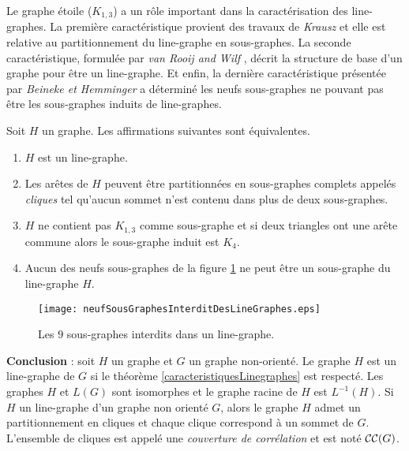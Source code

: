 Le graphe \'etoile ($K_{1,3}$) a un r\^ole important dans la caract\'erisation des line-graphes.
La premi\`ere caract\'eristique provient des travaux de {\em Krausz} \cite{krausz1943demonstration} et elle est relative au partitionnement du line-graphe en sous-graphes. 
La seconde caract\'eristique, formul\'ee par {\em van Rooij and Wilf} \cite{ROOIJetWILF1965interchange}, d\'ecrit la structure de base d'un graphe pour \^etre un line-graphe. 
Et enfin, la derni\`ere caract\'eristique pr\'esent\'ee par {\em Beineke\cite{beineke1968derived} et Hemminger} a d\'etermin\'e les neufs sous-graphes ne pouvant pas \^etre les sous-graphes induits  de line-graphes. 
\begin{theorem}\cite{lineGraphe}
\label{caracteristiquesLinegraphes}
Soit $H$ un graphe. Les affirmations suivantes sont \'equivalentes.
\begin{enumerate}[label = (\alph*)]
	\item $H$ est un line-graphe.
	\item Les ar\^etes de $H$ peuvent \^etre partitionn\'ees en sous-graphes complets appel\'es {\em cliques} tel qu'aucun sommet n'est contenu dans plus de deux sous-graphes. 
	\item $H$ ne contient pas $K_{1,3}$ comme sous-graphe et si deux triangles ont une ar\^ete commune alors le sous-graphe induit est $K_4$.
	\item Aucun des neufs sous-graphes de la figure \ref{neufSousGraphesInterditDesLineGraphes} ne peut \^etre un sous-graphe du line-graphe $H$.
\end{enumerate}
\end{theorem}

\begin{figure}[htb!]\vspace{-0.5em}
	\centering
	\texttt{[image: neufSousGraphesInterditDesLineGraphes.eps]}\vspace{-0.5em}
	\caption{ Les $9$ sous-graphes interdits dans un line-graphe. }\vspace{-0.5em}
	\label{neufSousGraphesInterditDesLineGraphes}
\end{figure}
\FloatBarrier

{\bf Conclusion} :
soit $H$ un graphe et $G$ un graphe non-orient\'e.
Le graphe $H$ est un line-graphe de $G$ si le th\'eor\`eme \ref{caracteristiquesLinegraphes} est respect\'e.
Les graphes $H$ et $L(G)$ sont isomorphes et le graphe racine de $H$ est $L^{-1}(H)$.
Si $H$ un line-graphe d'un graphe non orient\'e $G$,
alors le graphe $H$ admet un partitionnement en cliques et chaque clique correspond \`a un sommet de $G$. L'ensemble de cliques est appel\'e une {\em couverture de corr\'elation} et est not\'e ${\cal CC}(G)$.